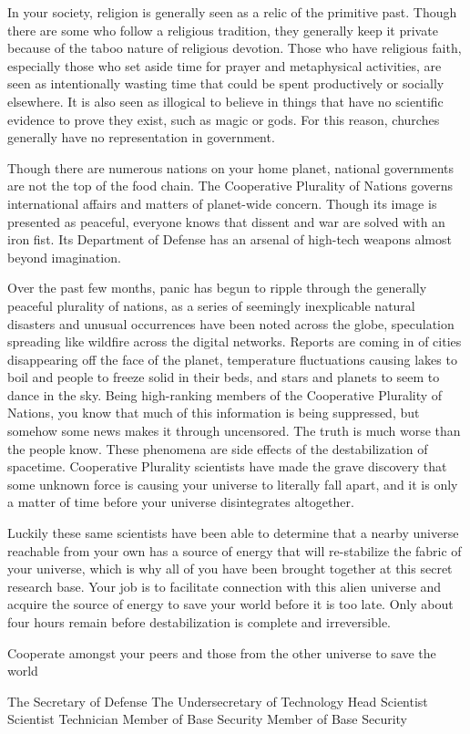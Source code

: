 \documentclass[blue]{guildcamp3}
\begin{document}
In your society, religion is generally seen as a relic of the primitive past. Though there are some who follow a religious tradition, they generally keep it private because of the taboo nature of religious devotion. Those who have religious faith, especially those who set aside time for prayer and metaphysical activities, are seen as intentionally wasting time that could be spent productively or socially elsewhere. It is also seen as illogical to believe in things that have no scientific evidence to prove they exist, such as magic or gods. For this reason, churches generally have no representation in government.

Though there are numerous nations on your home planet, national governments are not the top of the food chain. The Cooperative Plurality of Nations governs international affairs and matters of planet-wide concern. Though its image is presented as peaceful, everyone knows that dissent and war are solved with an iron fist. Its Department of Defense has an arsenal of high-tech weapons almost beyond imagination.

Over the past few months, panic has begun to ripple through the generally peaceful plurality of nations, as a series of seemingly inexplicable natural disasters and unusual occurrences have been noted across the globe, speculation spreading like wildfire across the digital networks. Reports are coming in of cities disappearing off the face of the planet, temperature fluctuations causing lakes to boil and people to freeze solid in their beds, and stars and planets to seem to dance in the sky. Being high-ranking members of the Cooperative Plurality of Nations, you know that much of this information is being suppressed, but somehow some news makes it through uncensored. The truth is much worse than the people know. These phenomena are side effects of the destabilization of spacetime. Cooperative Plurality scientists have made the grave discovery that some unknown force is causing your universe to literally fall apart, and it is only a matter of time before your universe disintegrates altogether.

Luckily these same scientists have been able to determine that a nearby universe reachable from your own has a source of energy that will re-stabilize the fabric of your universe, which is why all of you have been brought together at this secret research base. Your job is to facilitate connection with this alien universe and acquire the source of energy to save your world before it is too late. Only about four hours remain before destabilization is complete and irreversible.

\begin{itemz}[Goals]
	\item Cooperate amongst your peers and those from the other universe to save the world
\end{itemz}


\begin{members}
	\member{\cPoliOne{}} The Secretary of Defense
	\member{\cPoliTwo{}} The Undersecretary of Technology
	\member{\cSciOne{}} Head Scientist
	\member{\cSciTwo{}} Scientist
	\member{\cTech{}} Technician
	\member{\cSpecOpOne{}} Member of Base Security
	\member{\cSpecOpTwo{}} Member of Base Security
\end{members}
\end{document}
